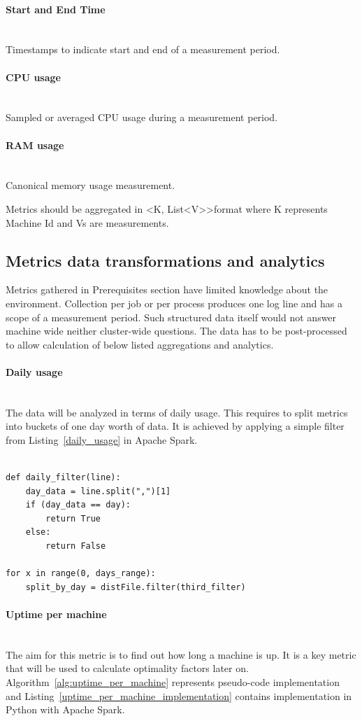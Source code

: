 \documentclass[]{final_report}
\newcommand{\myparagraph}[1]{\paragraph{#1}\mbox{}\\}
\begin{document}
\myparagraph{Start and End Time}
Timestamps to indicate start and end of a measurement period.

\myparagraph{CPU usage}
Sampled or averaged CPU usage during a measurement period. 

\myparagraph{RAM usage}
Canonical memory usage measurement. 

Metrics should be aggregated in \textless K, List\textless V\textgreater\textgreater format where K represents Machine Id and Vs are measurements. 

\subsection{Metrics data transformations and analytics}

Metrics gathered in Prerequisites section have limited knowledge about the environment. Collection per job or per process produces one log line and has a scope of a measurement period. Such structured data itself would not answer machine wide neither cluster-wide questions. The data has to be post-processed to allow calculation of below listed aggregations and analytics.   

\myparagraph{Daily usage}

The data will be analyzed in terms of daily usage. This requires to split metrics into buckets of one day worth of data. 
It is achieved by applying a simple filter from Listing~\ref{daily_usage} in Apache Spark.

\begin{lstlisting}[label={daily_usage},caption={Daily usage filter},frame=single]

def daily_filter(line):
    day_data = line.split(",")[1]
    if (day_data == day):
        return True
    else:
        return False

for x in range(0, days_range):
    split_by_day = distFile.filter(third_filter)

\end{lstlisting} 


\myparagraph{Uptime per machine}

The aim for this metric is to find out how long a machine is up. It is a key metric that will be used to calculate optimality factors later on. Algorithm~\ref{alg:uptime_per_machine} represents pseudo-code implementation and Listing~\ref{uptime_per_machine_implementation} contains implementation in Python with Apache Spark. 
\end{document}
